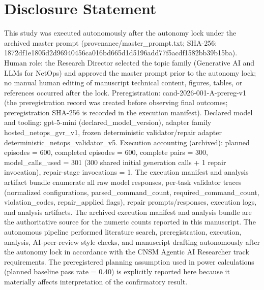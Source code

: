 \documentclass[conference]{IEEEtran}
\begin{document}
\section*{Disclosure Statement}
This study was executed autonomously after the autonomy lock under the archived master prompt (provenance/master\_prompt.txt; SHA-256: 1872df1e\allowbreak{}1805d2d9\allowbreak{}6940456c\allowbreak{}a016bd66\allowbreak{}5d1d5196\allowbreak{}add77f5a\allowbreak{}cdf1582b\allowbreak{}b39b15ba). Human role: the Research Director selected the topic family (Generative AI and LLMs for NetOps) and approved the master prompt prior to the autonomy lock; no manual human editing of manuscript technical content, figures, tables, or references occurred after the lock. Preregistration: cand-2026-001-A-prereg-v1 (the preregistration record was created before observing final outcomes; preregistration SHA-256 is recorded in the execution manifest). Declared model and tooling: gpt-5-mini (declared\_model\_version), adapter family hosted\_netops\_gvr\_v1, frozen deterministic validator/repair adapter deterministic\_netops\_validator\_v5. Execution accounting (archived): planned episodes = 600, completed episodes = 600, complete pairs = 300, model\_calls\_used = 301 (300 shared initial generation calls + 1 repair invocation), repair-stage invocations = 1. The execution manifest and analysis artifact bundle enumerate all raw model responses, per‑task validator traces (normalized configurations, parsed\_command\_count, required\_command\_count, violation\_codes, repair\_applied flags), repair prompts/responses, execution logs, and analysis artifacts. The archived execution manifest and analysis bundle are the authoritative source for the numeric counts reported in this manuscript. The autonomous pipeline performed literature search, preregistration, execution, analysis, AI‑peer‑review style checks, and manuscript drafting autonomously after the autonomy lock in accordance with the CNSM Agentic AI Researcher track requirements. The preregistered planning assumption used in power calculations (planned baseline pass rate = 0.40) is explicitly reported here because it materially affects interpretation of the confirmatory result.
\end{document}
